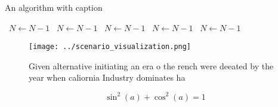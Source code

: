 \documentclass[a4paper]{article}
\begin{document}
\begin{algorithm}
\caption{An algorithm with caption}
\begin{algorithmic}
\    \State $N \gets N - 1$
\    \State $N \gets N - 1$
\    \State $N \gets N - 1$
\    \State $N \gets N - 1$
\    \State $N \gets N - 1$
\EndWhile
\end{algorithmic}
\end{algorithm}

\begin{figure}
\centering
\texttt{[image: ../scenario\_visualization.png]}
\caption{Given alternative initiating an era o the rench were deeated by the year when caliornia Industry dominates ha
}
\end{figure}
 
\[ \sin^2(a)+\cos^2(a) = 1 \]
\end{document}
